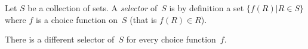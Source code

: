 \documentclass[12pt]{article}
\begin{document}
Let $S$ be a collection of sets. A \emph{selector} of~$S$ is by definition a set $\{f(R)|R\in S\}$ where $f$ is a choice function on~$S$ (that is $f(R)\in R$).

There is a different selector of~$S$ for every choice function~$f$.
\end{document}
